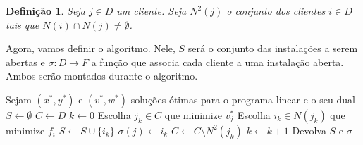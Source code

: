 \documentclass[12pt]{article}
\newtheorem{definition}[theorem]{Definição}
\begin{document}
\begin{definition}
    Seja $j\in D$ um cliente. Seja $N^2(j)$ o conjunto dos clientes $i \in D$ tais que $N(i) \cap N(j) \neq \emptyset$.
\end{definition}
Agora, vamos definir o algoritmo. Nele, $S$ será o conjunto das instalações a serem abertas e $\sigma : D \rightarrow F $ a função que associa cada cliente a uma instalação aberta. Ambos serão montados durante o algoritmo.
\begin{algorithm}
    \begin{algorithmic}[1]
        \State Sejam $(x^*,y^*)$ e $(v^*,w^*)$ soluções ótimas para o programa linear e o seu dual
        \State $S \gets \emptyset$
        \State $C \gets D$ 
        \State $k \gets 0$
        \State Escolha $j_k \in C$ que minimize $v_j^*$
        \State Escolha $i_k \in N(j_k)$ que minimize $f_{i}$
        \State $S \gets S \cup \{i_k\}$
        \State $\sigma(j) \leftarrow i_k$
        \EndFor
        \State $C \gets C \setminus N^2(j_k)$
        \State $k \gets k+1$
        \EndWhile
        \State Devolva $S$ e $\sigma$
        \EndFunction
    \end{algorithmic}
\end{algorithm}
\end{document}
